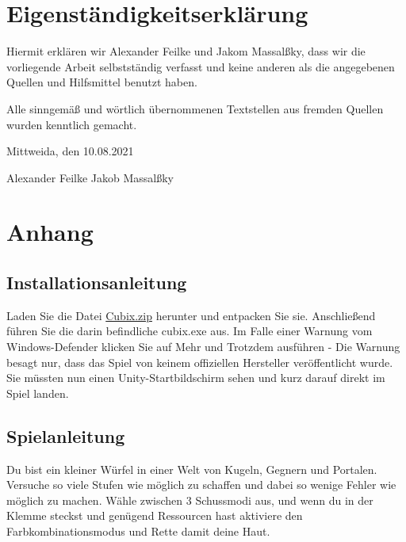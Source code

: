 \documentclass[a4paper,10pt,ngerman,fontsize=12pt]{scrreprt}
\begin{document}
\chapter{Eigenständigkeitserklärung}

Hiermit erklären wir Alexander Feilke und Jakom Massal{\ss}ky, dass wir die vorliegende Arbeit selbstständig verfasst und keine anderen als die angegebenen Quellen und Hilfsmittel benutzt haben.

Alle sinngemä{\ss} und wörtlich übernommenen Textstellen aus fremden Quellen wurden kenntlich gemacht.

Mittweida, den 10.08.2021

\vspace{2cm}

Alexander Feilke \hspace{4cm} Jakob Massal{\ss}ky





\newpage
\newpage
\chapter{Anhang}




\section{Installationsanleitung}

Laden Sie die Datei \href{https://www.dropbox.com/s/g82vexjznq1x9dd/Cubix.zip?dl=1}{Cubix.zip} herunter und entpacken Sie sie. Anschlie{\ss}end führen Sie die darin befindliche cubix.exe aus.
Im Falle einer Warnung vom Windows-Defender klicken Sie auf Mehr und Trotzdem ausführen - Die Warnung besagt nur, dass das Spiel von keinem offiziellen Hersteller veröffentlicht wurde.
Sie müssten nun einen Unity-Startbildschirm sehen und kurz darauf direkt im Spiel landen.




\section{Spielanleitung}

Du bist ein kleiner Würfel in einer Welt von Kugeln, Gegnern und Portalen. Versuche so viele Stufen wie möglich zu schaffen und dabei so wenige Fehler wie möglich zu machen. Wähle zwischen 3 Schussmodi aus, und wenn du in der Klemme steckst und genügend Ressourcen hast aktiviere den Farbkombinationsmodus und Rette damit deine Haut.
\end{document}
